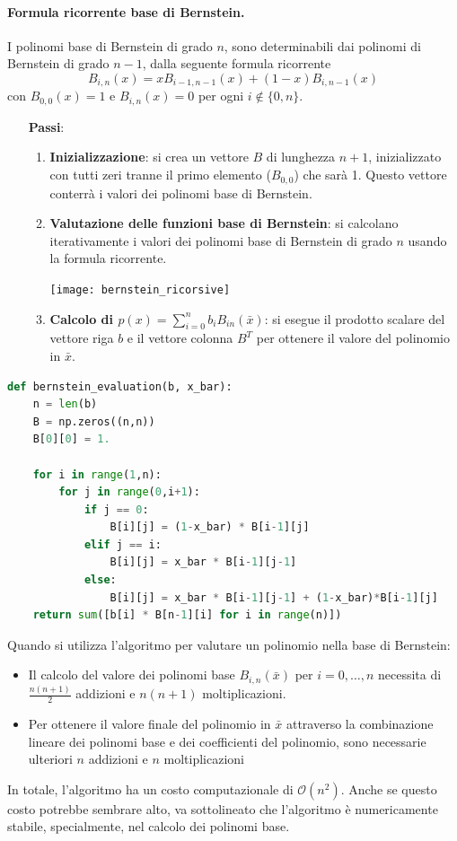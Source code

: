 \documentclass{article}
\begin{document}
\paragraph{Formula ricorrente base di Bernstein.}
I polinomi base di Bernstein di grado $n$, sono determinabili dai polinomi di
Bernstein di grado $n-1$, dalla seguente formula ricorrente
$$B_{i,n}(x)=xB_{i-1,n-1}(x)+(1-x)B_{i,n-1}(x)$$
con $B_{0,0}(x)=1$ e $B_{i,n}(x)=0$ per ogni $i\notin\{0,n\}$.
\begin{itemize}
    \item[\textbf{Passi}:]
    \begin{enumerate}
        \item \textbf{Inizializzazione}: si crea un vettore $B$ di lunghezza $n+1$, 
            inizializzato con tutti zeri tranne il primo elemento ($B_{0,0}$) che
            sarà 1. Questo vettore conterrà i valori dei polinomi base di
            Bernstein.
        \item \textbf{Valutazione delle funzioni base di Bernstein}: si calcolano
            iterativamente i valori dei polinomi base di Bernstein di grado $n$
            usando la formula ricorrente.
            \begin{center}
                \texttt{[image: bernstein\_ricorsive]}
            \end{center}
        \item \textbf{Calcolo di
            $p(x)=\displaystyle\sum_{i=0}^{n}b_iB_{in}(\bar{x})$}: si esegue il prodotto
            scalare del vettore riga $b$ e
            il vettore colonna $B^T$ per ottenere il valore del polinomio in
            $\bar{x}$.
    \end{enumerate}
\end{itemize}
\begin{lstlisting}[language=Python]
def bernstein_evaluation(b, x_bar):
    n = len(b)
    B = np.zeros((n,n))
    B[0][0] = 1.

    for i in range(1,n):
        for j in range(0,i+1):
            if j == 0:
                B[i][j] = (1-x_bar) * B[i-1][j]
            elif j == i:
                B[i][j] = x_bar * B[i-1][j-1]
            else:
                B[i][j] = x_bar * B[i-1][j-1] + (1-x_bar)*B[i-1][j]
    return sum([b[i] * B[n-1][i] for i in range(n)])
\end{lstlisting}
Quando si utilizza l'algoritmo per valutare un polinomio nella base di
Bernstein:
\begin{itemize}
    \item Il calcolo del valore dei polinomi base $B_{i,n}(\bar{x})$ per
        $i=0,\ldots,n$ necessita di $\frac{n(n+1)}{2}$ addizioni e
        $n(n+1)$ moltiplicazioni.
    \item Per ottenere il valore finale del polinomio in $\bar{x}$ attraverso
        la combinazione lineare dei polinomi base e dei coefficienti del
        polinomio, sono necessarie ulteriori $n$ addizioni e $n$
        moltiplicazioni
\end{itemize}
In totale, l'algoritmo ha un costo computazionale di $\mathcal{O}(n^2)$. 
Anche se questo costo potrebbe sembrare alto, va sottolineato che l'algoritmo
è numericamente stabile, specialmente, nel calcolo dei polinomi base.
\end{document}
